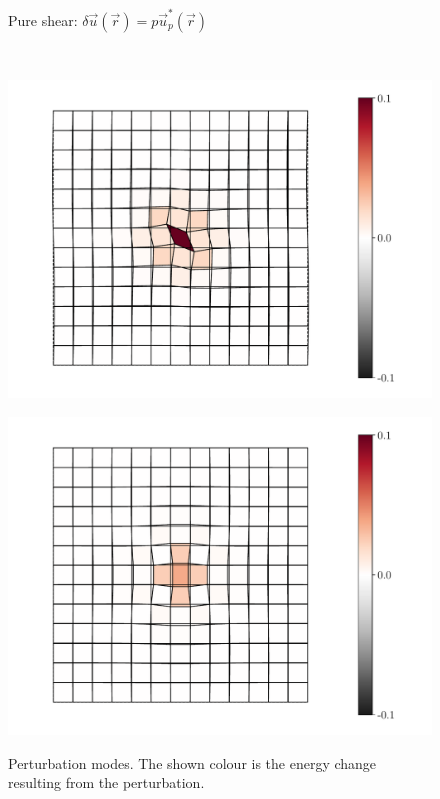 \documentclass[fleqn]{goose-article}
\begin{document}
\begin{figure}[htp]
\begin{minipage}[t]{.49\textwidth}
{            Pure shear:
            $\delta \vec{u}(\vec{r}) = p \vec{u}^*_p (\vec{r})$
        }
        \label{fig:perturbation:pure-shear:pos}
    \end{minipage}
    \\
    \begin{minipage}[t]{.49\textwidth}
        \centering
        \includegraphics[width=\textwidth]{perturbation_simple-shear_neg.pdf}
        \label{fig:perturbation:simple-shear:neg}
    \end{minipage}
    \hfill
    \begin{minipage}[t]{.49\textwidth}
        \centering
        \includegraphics[width=\textwidth]{perturbation_pure-shear_neg.pdf}
        \label{fig:perturbation:pure-shear:neg}
    \end{minipage}
    \caption{
        Perturbation modes.
        The shown colour is the energy change resulting from the perturbation.
    }
    \label{fig:perturbation}
\end{figure}
\end{document}
